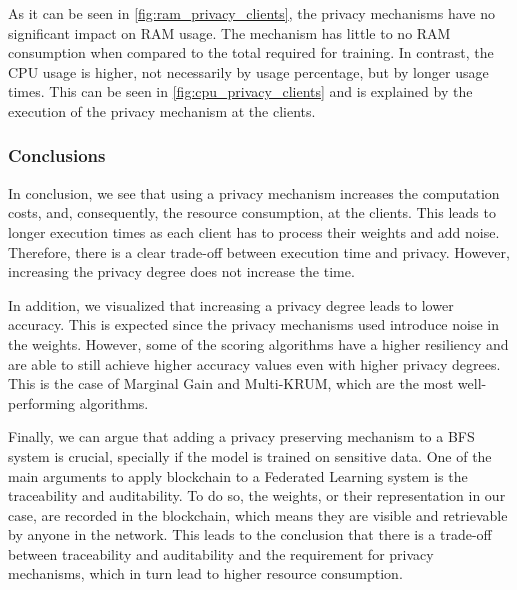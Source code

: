 As it can be seen in \autoref{fig:ram_privacy_clients}, the privacy mechanisms have no significant impact on RAM usage. The mechanism has little to no RAM consumption when compared to the total required for training. In contrast, the CPU usage is higher, not necessarily by usage percentage, but by longer usage times. This can be seen in \autoref{fig:cpu_privacy_clients} and is explained by the execution of the privacy mechanism at the clients.

\subsubsection{Conclusions}

In conclusion, we see that using a privacy mechanism increases the computation costs, and, consequently, the resource consumption, at the clients. This leads to longer execution times as each client has to process their weights and add noise. Therefore, there is a clear trade-off between execution time and privacy. However, increasing the privacy degree does not increase the time.

In addition, we visualized that increasing a privacy degree leads to lower accuracy. This is expected since the privacy mechanisms used introduce noise in the weights. However, some of the scoring algorithms have a higher resiliency and are able to still achieve higher accuracy values even with higher privacy degrees. This is the case of Marginal Gain and Multi-KRUM, which are the most well-performing algorithms.

Finally, we can argue that adding a privacy preserving mechanism to a BFS system is crucial, specially if the model is trained on sensitive data. One of the main arguments to apply blockchain to a Federated Learning system is the traceability and auditability. To do so, the weights, or their representation in our case, are recorded in the blockchain, which means they are visible and retrievable by anyone in the network. This leads to the conclusion that there is a trade-off between traceability and auditability and the requirement for privacy mechanisms, which in turn lead to higher resource consumption.
